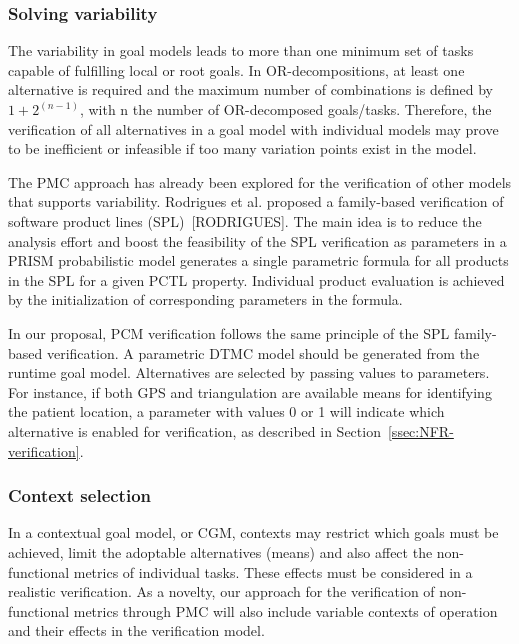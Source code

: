 
\subsubsection{Solving variability}

The variability in goal models leads to more than one minimum set of tasks capable of fulfilling local or root goals. In OR-decompositions, at least one alternative is required and the maximum number of combinations is defined by $1 + 2^{(n-1)}$, with n the number of OR-decomposed goals/tasks. Therefore, the verification of all alternatives in a goal model with individual models may prove to be inefficient or infeasible if too many variation points exist in the model.

The PMC approach has already been explored for the verification of other models that supports variability. Rodrigues et al. proposed a family-based verification of software product lines (SPL)~[RODRIGUES]. The main idea is to reduce the analysis effort and boost the feasibility of the SPL verification as parameters in a PRISM probabilistic model generates a single parametric formula for all products in the SPL for a given PCTL property. Individual product evaluation is achieved by the initialization of corresponding parameters in the formula. 

In our proposal, PCM verification follows the same principle of the SPL family-based verification. A parametric DTMC model should be generated from the runtime goal model. Alternatives are selected by passing values to parameters. For instance, if both GPS and triangulation are available means for identifying the patient location, a parameter with values 0 or 1 will indicate which alternative is enabled for verification, as described in Section~\ref{ssec:NFR-verification}.

\subsubsection{Context selection}

In a contextual goal model, or CGM, contexts may restrict which goals must be achieved, limit the adoptable alternatives (means) and also affect the non-functional metrics of individual tasks. These effects must be considered in a realistic verification. As a novelty, our approach for the verification of non-functional metrics through PMC will also include variable contexts of operation and their effects in the verification model. 

